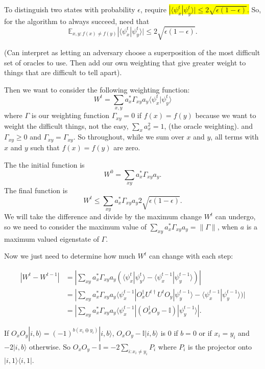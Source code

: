 \documentclass[12pt]{article}
\newcommand{\hilight}[1]{\colorbox{yellow}{#1}}
\begin{document}
To distinguish two states with probability $\epsilon$, require \hilight{$|\langle\psi_x^t|\psi_y^t\rangle|\leq 2\sqrt{\epsilon(1-\epsilon)}.$}
So, for the algorithm to always succeed, need that
$$\mathbb{E}_{x,y: f(x)\neq f(y)}|\langle\psi_x^t|\psi_y^t\rangle|\leq 2\sqrt{\epsilon(1-\epsilon)}.$$

(Can interpret as  letting an adversary choose a superposition of the most difficult set of oracles to use. Then add our own weighting that give greater weight to things that are difficult to tell apart).

Then we want to consider the following weighting function:
$$W^t=\sum_{x,y}a_x^*\Gamma_{xy} a_y\langle\psi_x^t|\psi_y^t\rangle$$
where $\Gamma$ is our weighting function $\Gamma_{xy}=0$ if $f(x)=f(y)$ because we want to weight the difficult things, not the easy, $\sum_xa_x^2=1$, (the oracle weighting).
and $\Gamma_{xy}\geq 0$ and $\Gamma_{xy}=\Gamma_{xy}$. 
So throughout, while we sum over $x$ and $y$, all terms with $x$ and $y$ such that $f(x)=f(y)$ are zero.

The the initial function is 
$$W^0=\sum_{xy}a_x^*\Gamma_{xy} a_y.$$
The final function is
$$W^t\leq\sum_{xy}a_x^*\Gamma_{xy} a_y2\sqrt{\epsilon(1-\epsilon)}.$$
We will take the difference and divide by the maximum change $W^t$ can undergo, so we need to consider
the maximum value of $\sum_{xy}a_x^*\Gamma_{xy} a_y=\|\Gamma\|$, when 
$a$ is a maximum valued eigenstate of $\Gamma$.

Now we just need to determine how much $W^t$ can change with each step:

\begin{align}
|W^t-W^{t-1}|&=|\sum_{xy}a_x^*\Gamma_{xy} a_y(\langle\psi_x^t|\psi_y^t\rangle-\langle\psi_x^{t-1}|\psi_y^{t-1}\rangle)| \\
&=|\sum_{xy}a_x^*\Gamma_{xy} a_y\langle\psi_x^{t-1} |O_x^\dagger U^{t\dagger} U^t O_y|\psi_y^{t-1}\rangle-\langle\psi_x^{t-1}|\psi_y^{t-1}\rangle)| \\
&=|\sum_{xy}a_x^*\Gamma_{xy} a_y\langle\psi_x^{t-1}|( O_x^\dagger O_y-\mathbb{I})|\psi_y^{t-1}\rangle|.
\end{align}

If $O_xO_y|i,b\rangle=(-1)^{b(x_i\oplus y_i)}|i,b\rangle$, $O_xO_y-\mathbb{I}|i,b\rangle$ is 0 if $b=0$ or if $x_i=y_i$ and $-2|i,b\rangle$
otherwise. So   $O_xO_y-\mathbb{I}=-2\sum_{i:x_i\neq y_i}P_i$ where $P_i$ is the projector onto $|i,1\rangle\langle i,1|$.
\end{document}
